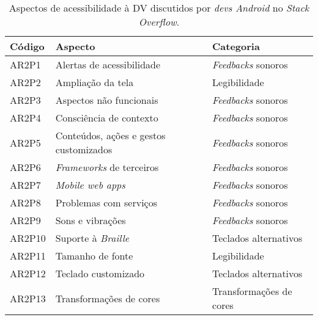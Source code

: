 \begin{table}[htb]
  \begin{center}
    \ABNTEXfontereduzida
    \caption{Aspectos de acessibilidade à DV discutidos por \emph{devs Android} no \emph{Stack Overflow}.}
    \label{tab-acc-asp-sta-flow}
    \begin{tabular}{p{1.2cm}|p{7.0cm}|p{3.8cm}}
      \textbf{Código} & \textbf{Aspecto}                       & \textbf{Categoria}       \\
      \hline
      AR2P1           & Alertas de acessibilidade              & \emph{Feedbacks} sonoros \\
      \hline
      AR2P2           & Ampliação da tela                      & Legibilidade             \\
      \hline
      AR2P3           & Aspectos não funcionais                & \emph{Feedbacks} sonoros \\
      \hline
      AR2P4           & Consciência de contexto                & \emph{Feedbacks} sonoros \\
      \hline
      AR2P5           & Conteúdos, ações e gestos customizados & \emph{Feedbacks} sonoros \\
      \hline
      AR2P6           & \emph{Frameworks} de terceiros         & \emph{Feedbacks} sonoros \\
      \hline
      AR2P7           & \emph{Mobile web apps}                 & \emph{Feedbacks} sonoros \\
      \hline
      AR2P8           & Problemas com serviços                 & \emph{Feedbacks} sonoros \\
      \hline
      AR2P9           & Sons e vibrações                       & \emph{Feedbacks} sonoros \\
      \hline
      AR2P10          & Suporte à \emph{Braille}               & Teclados alternativos    \\
      \hline
      AR2P11          & Tamanho de fonte                       & Legibilidade             \\
      \hline
      AR2P12          & Teclado customizado                    & Teclados alternativos    \\
      \hline
      AR2P13          & Transformações de cores                & Transformações de cores  \\
    \end{tabular}
  \end{center}
\end{table}

